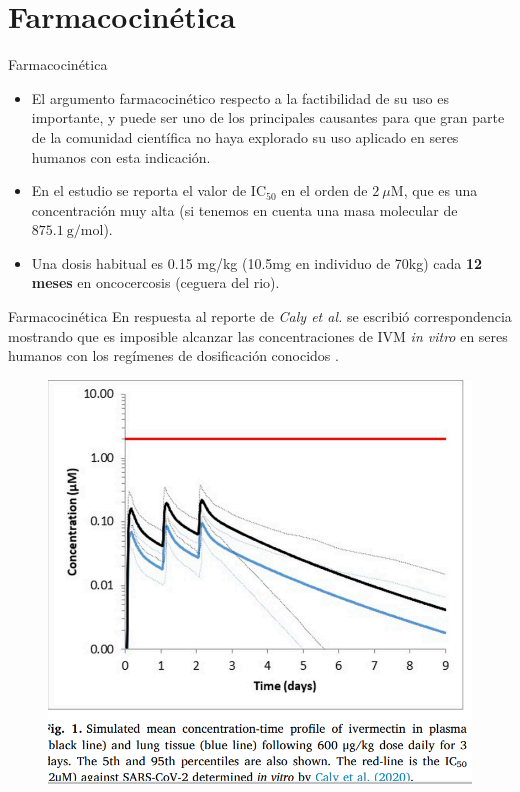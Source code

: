\documentclass[12pt,xcolor=dvipsnames]{beamer}
\begin{document}
	\section{Farmacocinética}
	\begin{frame}{Farmacocinética}
		\small
		\begin{itemize}
	 		\item El argumento farmacocinético respecto a la factibilidad de su uso es importante, y puede ser uno de los principales causantes para que gran parte de la comunidad científica no haya explorado su uso aplicado en seres humanos con esta indicación. \\
			
			\item En el estudio se reporta el valor de $\mathrm{IC_{50}}$ en el orden de $2~\mu\mathrm{M}$, que es una concentración muy alta (si tenemos en cuenta una masa molecular de $875.1~\mathrm{g/mol}$). \\
						
			\item Una dosis habitual es 0.15 mg/kg (10.5mg en individuo de 70kg) cada \textbf{12 meses} en oncocercosis (ceguera del rio).
		\end{itemize}
	\end{frame}
	
	\begin{frame}{Farmacocinética}
		\scriptsize
		En respuesta al reporte de \textit{Caly et al.} se escribió correspondencia mostrando que es imposible alcanzar las concentraciones de IVM \textit{in vitro} en seres humanos con los regímenes de dosificación conocidos \citep{Rayner2020}. 
		\begin{figure}
			\centering\includegraphics[width=0.5\linewidth]{figs/ivermectin_profile}
		\end{figure}
	\end{frame}
	
\end{document}
